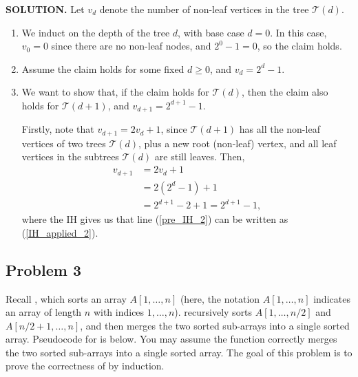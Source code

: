 \documentclass[11pt]{article}
\begin{document}
\begin{framed}
	\noindent\textbf{SOLUTION.}
	Let $v_d$ denote the number of non-leaf vertices in the tree $\mathcal{T}(d)$.
	\begin{enumerate}
		\item We induct on the depth of the tree $d$, with base case $d = 0$. In this case, $v_0 = 0$ since there are no non-leaf nodes, and $2^0-1=0$, so the claim holds.
		\item Assume the claim holds for some fixed $d \geq 0$, and $v_d = 2^d -1$.
		\item We want to show that, if the claim holds for $\mathcal{T}(d)$, then the claim also holds for $\mathcal{T}(d+1)$, and $v_{d+1} = 2^{d+1}-1$.

		Firstly, note that $v_{d+1} = 2v_d + 1$, since $\mathcal{T}(d+1)$ has all the non-leaf vertices of two trees $\mathcal{T}(d)$, plus a new root (non-leaf) vertex, and all leaf vertices in the subtrees $\mathcal{T}(d)$ are still leaves. Then,
		\begin{align}
			v_{d+1} &= 2v_d + 1 \label{pre_IH_2}\\
			&= 2\left(2^d - 1\right) + 1\label{IH_applied_2}\\
			&= 2^{d+1} - 2 + 1 = 2^{d+1} - 1,
		\end{align}
		where the IH gives us that line (\ref{pre_IH_2}) can be written as (\ref{IH_applied_2}).
	\end{enumerate}
\end{framed}
\newpage



\subsection*{Problem 3}
Recall , which sorts an array $A[1, \ldots, n]$ (here, the notation $A[1, \ldots, n]$ indicates an array of length $n$ with indices $1, \ldots, n$).  recursively sorts $A[1, \ldots, n/2]$ and $A[n/2+1, \ldots, n]$, and then merges the two sorted sub-arrays into a single sorted array. Pseudocode for  is below. You may assume the  function correctly merges the two sorted sub-arrays into a single sorted array. The goal of this problem is to prove the correctness of  by induction.
\end{document}
